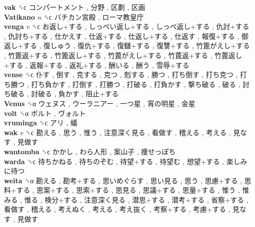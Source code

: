 \textbf{vak} ␝ϲ   コンパートメント ,  分野 ,  区劃 ,  区画   \\
\textbf{Vatikano} \emph{n}  ␝ϲ   バチカン宮殿 ,  ローマ教皇庁   \\
\textbf{venga} \emph{v}  ␝ϲ   お返し+する ,  しっぺい返し+する ,  しっぺ返し+する ,  仇討+する ,  仇討ち+する ,  仕かえす ,  仕返+する ,  仕返し+する ,  仕返す ,  報復+する ,  御返し+する ,  復しゅう ,  復仇+する ,  復讎+する ,  復讐+する ,  竹篦がえし+する ,  竹篦返+する ,  竹篦返し+する ,  竹蓖がえし+する ,  竹蓖返+する ,  竹蓖返し+する ,  返報+する ,  返礼+する ,  酬いる ,  酬う ,  雪辱+する   \\
\textbf{vense} ␝ϲ   仆す ,  倒す ,  克する ,  克つ ,  剋する ,  勝つ ,  打ち倒す ,  打ち克つ ,  打ち勝つ ,  打ち負かす ,  打倒す ,  打勝つ ,  打破る ,  打負かす ,  撃ち破る ,  破る ,  討ち破る ,  討破る ,  負かす ,  阻止+する   \\
\textbf{Venus} ␝α   ウェヌス ,  ウーラニアー ,  一つ星 ,  宵の明星 ,  金星   \\
\textbf{volt} ␝α   ボルト ,  ヴォルト   \\
\textbf{vruminga} ␝ϲ   アリ ,  蟻   \\
\textbf{wak} \emph{v}  ␝ϲ   勘える ,  思う ,  惟う ,  注意深く見る ,  看做す ,  稽える ,  考える ,  見なす ,  見做す   \\
\textbf{wantomba} ␝ϲ   かかし ,  わら人形 ,  案山子 ,  痩せっぽち   \\
\textbf{warda} ␝ϲ   待ちかねる ,  待ちのぞむ ,  待望+する ,  待望む ,  想望+する ,  楽しみに待つ   \\
\textbf{weita} ␝α   勘える ,  勘考+する ,  思いめぐらす ,  思い見る ,  思う ,  思慮+する ,  思料+する ,  思案+する ,  思索+する ,  思見る ,  思議+する ,  思量+する ,  惟う ,  惟みる ,  惟る ,  検分+する ,  注意深く見る ,  潜思+する ,  潜考+する ,  省察+する ,  看做す ,  稽える ,  考えぬく ,  考える ,  考え抜く ,  考察+する ,  考慮+する ,  見なす ,  見做す   \\

